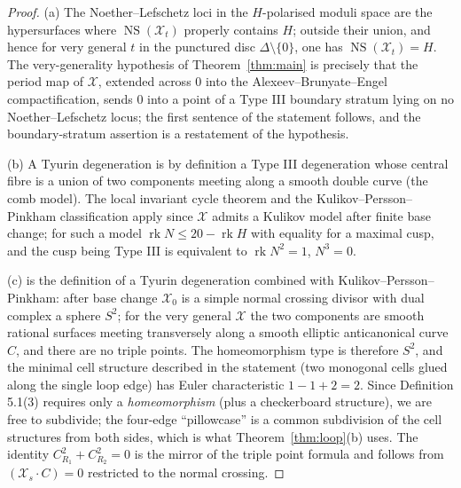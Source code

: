 \documentclass[11pt]{article}
\newcommand{\X}{\mathcal{X}}
\newcommand{\D}{\Delta}
\DeclareMathOperator{\rk}{rk}
\DeclareMathOperator{\NS}{NS}
\begin{document}
\begin{proof}
(a) The Noether--Lefschetz loci in the $H$-polarised moduli space are
the hypersurfaces where $\NS(\X_t)$ properly contains $H$; outside their
union, and hence for very general $t$ in the punctured disc
$\D\setminus\{0\}$, one has $\NS(\X_t)=H$. The very-generality hypothesis
of Theorem~\ref{thm:main} is precisely that the period map of $\X$,
extended across $0$ into the Alexeev--Brunyate--Engel compactification,
sends $0$ into a point of a Type III boundary stratum lying on no
Noether--Lefschetz locus; the first sentence of the statement follows,
and the boundary-stratum assertion is a restatement of the hypothesis.

(b) A Tyurin degeneration is by definition a Type III degeneration whose
central fibre is a union of two components meeting along a smooth double
curve (the comb model). The local invariant cycle theorem and the
Kulikov--Persson--Pinkham classification apply since $\X$ admits a
Kulikov model after finite base change; for such a model $\rk N \le
20 - \rk H$ with equality for a maximal cusp, and the cusp being
Type III is equivalent to $\rk N^2 = 1$, $N^3 = 0$.

(c) is the definition of a Tyurin degeneration combined with
Kulikov--Persson--Pinkham: after base change $\X_0$ is a simple normal
crossing divisor with dual complex a sphere $S^2$; for the very general
$\X$ the two components are smooth rational surfaces meeting transversely
along a smooth elliptic anticanonical curve $C$, and there are no triple
points. The homeomorphism type is therefore $S^2$, and the minimal cell
structure described in the statement (two monogonal cells glued along the
single loop edge) has Euler characteristic $1-1+2=2$. Since
Definition 5.1(3) requires only a \emph{homeomorphism} (plus a
checkerboard structure), we are free to subdivide; the four-edge
``pillowcase'' is a common subdivision of the cell structures from both
sides, which is what Theorem~\ref{thm:loop}(b) uses. The identity
$C^2_{R_1}+C^2_{R_2}=0$ is the mirror of the triple point formula and
follows from $(\X_s\cdot C)=0$ restricted to the normal crossing.


\end{proof}
\end{document}
